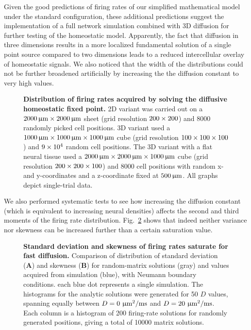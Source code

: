 \documentclass[10pt,letterpaper]{article}
\begin{document}
Given the good predictions of firing rates of our simplified mathematical model under the standard configuration, these additional predictions suggest the implementation of a full network simulation combined with 3D diffusion for further testing of the homeostatic model. Apparently, the fact that diffusion in three dimensions results in a more localized fundamental solution of a single point source compared to two dimensions leads to a reduced intercellular overlay of homeostatic signals. We also noticed that the width of the distributions could not be further broadened artificially by increasing the the diffusion constant to very high values.
\begin{figure}
\caption{{\bf Distribution of firing rates acquired by solving the diffusive homeostatic fixed point.} 2D variant was carried out on a $\rm 2000\, \upmu m \times 2000\, \upmu m$ sheet (grid resolution $\rm 200 \times 200$) and $8000$ randomly picked cell positions. 3D variant used a $\rm 1000\, \upmu m \times 1000\, \upmu m \times 1000\, \upmu m$ cube (grid resolution $\rm 100 \times 100 \times 100$) and $\rm 9\times 10^4$ random cell positions. The 3D variant with a flat neural tissue used a $\rm 2000\, \upmu m \times 2000\, \upmu m \times 1000\, \upmu m$ cube (grid resolution $\rm 200 \times 200 \times 100$) and $8000$ cell positions with random x- and y-coordinates and a z-coordinate fixed at $\rm 500\, \upmu m$. All graphs depict single-trial data.}
\label{Large_Diff_Test}
\end{figure}

We also performed systematic tests to see how increasing the diffusion constant (which is equivalent to increasing neural densities) affects the second and third moments of the firing rate distribution. Fig.~\ref{std_and_skew_sim_and_analytic} shows that indeed neither variance nor skewness can be increased further than a certain saturation value.

\begin{figure}
\caption{{\bf Standard deviation and skewness of firing rates saturate for fast diffusion.} Comparison of distribution of standard deviation (\textbf{A}) and skewness (\textbf{B}) for random-matrix solutions (gray) and values acquired from simulation (blue), with Neumann boundary conditions. each blue dot represents a single simulation. The histograms for the analytic solutions were generated for 50 $D$ values, spanning equally between $D = \rm 0~\upmu m^2 / ms$ and $D = \rm 20~ \upmu m^2 /ms$. Each column is a histogram of 200 firing-rate solutions for randomly generated positions, giving a total of 10000 matrix solutions.}
\label{std_and_skew_sim_and_analytic}
\end{figure}
\end{document}
